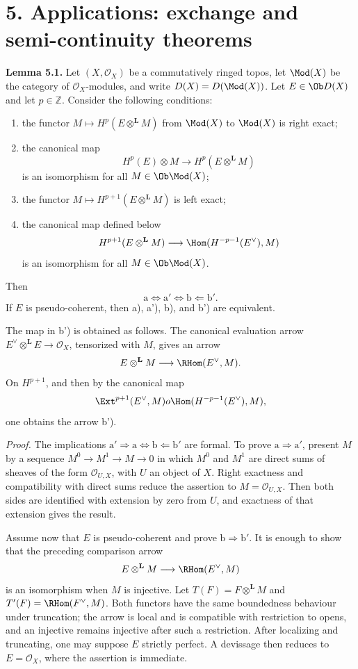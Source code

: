 \documentclass[11pt]{article}
\begin{document}
\section*{5. Applications: exchange and semi-continuity theorems}

\textbf{Lemma 5.1.} Let \((X,\mathcal O_X)\) be a commutatively ringed topos, let \(\Mod(X)\) be the category of \(\mathcal O_X\)-modules, and write \(D(X)=D(\Mod(X))\). Let \(E\in\Ob D(X)\) and let \(p\in\mathbb Z\). Consider the following conditions:
\begin{enumerate}[label=\alph*)]
\item the functor \(M\mapsto H^p(E\otimes^{\mathbf L}M)\) from \(\Mod(X)\) to \(\Mod(X)\) is right exact;
\item[\(\mathrm a'\)] the canonical map
\[
 H^p(E)\otimes M\longrightarrow H^p(E\otimes^{\mathbf L}M)
\]
is an isomorphism for all \(M\in\Ob\Mod(X)\);
\item[\(\mathrm b\)] the functor \(M\mapsto H^{p+1}(E\otimes^{\mathbf L}M)\) is left exact;
\item[\(\mathrm b'\)] the canonical map defined below
\[
 H^{p+1}(E\otimes^{\mathbf L}M)
 \longrightarrow
 \Hom(H^{-p-1}(E^{\vee}),M)
\]
is an isomorphism for all \(M\in\Ob\Mod(X)\).
\end{enumerate}
Then
\[
 \mathrm a\Longleftrightarrow \mathrm a'
 \Longleftrightarrow \mathrm b
 \Longleftarrow \mathrm b'.
\]
If \(E\) is pseudo-coherent, then a), a'), b), and b') are equivalent.

The map in b') is obtained as follows. The canonical evaluation arrow \(E^{\vee}\otimes^{\mathbf L}E\to\mathcal O_X\), tensorized with \(M\), gives an arrow
\[
 E\otimes^{\mathbf L}M\longrightarrow\RHom(E^{\vee},M).
\]
On \(H^{p+1}\), and then by the canonical map
\[
 \Ext^{p+1}(E^{\vee},M)	o\Hom(H^{-p-1}(E^{\vee}),M),
\]
one obtains the arrow b').

\emph{Proof.} The implications \(\mathrm a'\Rightarrow\mathrm a\Leftrightarrow\mathrm b\Leftarrow\mathrm b'\) are formal. To prove \(\mathrm a\Rightarrow\mathrm a'\), present \(M\) by a sequence \(M^0\to M^1\to M\to0\) in which \(M^0\) and \(M^1\) are direct sums of sheaves of the form \(\mathcal O_{U,X}\), with \(U\) an object of \(X\). Right exactness and compatibility with direct sums reduce the assertion to \(M=\mathcal O_{U,X}\). Then both sides are identified with extension by zero from \(U\), and exactness of that extension gives the result.

Assume now that \(E\) is pseudo-coherent and prove \(\mathrm b\Rightarrow\mathrm b'\). It is enough to show that the preceding comparison arrow
\[
 E\otimes^{\mathbf L}M\longrightarrow\RHom(E^{\vee},M)
\]
is an isomorphism when \(M\) is injective. Let \(T(F)=F\otimes^{\mathbf L}M\) and \(T'(F)=\RHom(F^{\vee},M)\). Both functors have the same boundedness behaviour under truncation; the arrow is local and is compatible with restriction to opens, and an injective remains injective after such a restriction. After localizing and truncating, one may suppose \(E\) strictly perfect. A devissage then reduces to \(E=\mathcal O_X\), where the assertion is immediate.
\end{document}

